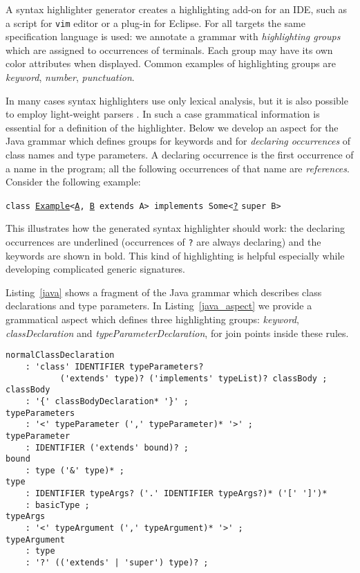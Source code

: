 \documentclass{IOS-Book-Article}     %
\newcommand{\lstref}[1]{Listing~\ref{#1}}
\begin{document}
A syntax highlighter generator creates a highlighting add-on for an IDE, such as a script for \texttt{vim} editor or a plug-in for Eclipse. For all targets the same specification language is used: we annotate a grammar with \emph{highlighting groups} which are assigned to occurrences of terminals. Each group may have its own color attributes when displayed. Common examples of highlighting groups are \emph{keyword}, \emph{number}, \emph{punctuation}. 

In many cases syntax highlighters use only lexical analysis, but it is also possible to employ light-weight parsers \cite{Island}. In such a case grammatical information is essential for a definition of the highlighter. Below we develop an aspect for the Java grammar which defines groups for keywords and for \emph{declaring occurrences} of class names and type parameters. A declaring occurrence is the first occurrence of a name in the program; all the following occurrences of that name are \emph{references}. Consider the following example:

\lstset{language=Java}
\lstinline!class!\texttt{ \ul{Example}<\ul{A}, \ul{B} }\lstinline!extends!\texttt{ A> }\lstinline!implements!\texttt{ Some<\ul{?}} \lstinline!super!\texttt{ B>} 

This illustrates how the generated syntax highlighter should work: the declaring occurrences are underlined (occurrences of \texttt{?} are always declaring) and the keywords are shown in bold. This kind of highlighting is helpful especially while developing complicated generic signatures.

\lstref{java} shows a fragment of the Java grammar \cite{JLS} which describes class declarations and type parameters. In \lstref{java_aspect} we provide a grammatical aspect which defines three highlighting groups: \emph{keyword}, \emph{classDeclaration} and \emph{typeParameterDeclaration}, for join points inside these rules.

\begin{lstlisting}[language=Grammatic,caption=Class declaration syntax in Java 5,label=java,float]
normalClassDeclaration
	: 'class' IDENTIFIER typeParameters? 
           ('extends' type)? ('implements' typeList)? classBody ;
classBody
	: '{' classBodyDeclaration* '}' ;
typeParameters
	: '<' typeParameter (',' typeParameter)* '>' ;
typeParameter
	: IDENTIFIER ('extends' bound)? ;
bound
	: type ('&' type)* ;
type
	: IDENTIFIER typeArgs? ('.' IDENTIFIER typeArgs?)* ('[' ']')*
	: basicType ;
typeArgs
	: '<' typeArgument (',' typeArgument)* '>' ;
typeArgument
	: type
	: '?' (('extends' | 'super') type)? ;
\end{lstlisting}
\end{document}

